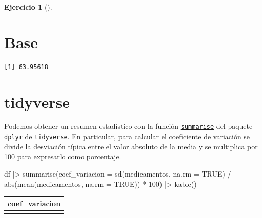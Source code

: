 \documentclass[
  spanish,
  a4paper,
]{scrreport}
\newenvironment{Shaded}{\begin{snugshade}}{\end{snugshade}}
\newcommand{\AttributeTok}[1]{\textcolor[rgb]{0.40,0.45,0.13}{#1}}
\newcommand{\ConstantTok}[1]{\textcolor[rgb]{0.56,0.35,0.01}{#1}}
\newcommand{\DecValTok}[1]{\textcolor[rgb]{0.68,0.00,0.00}{#1}}
\newcommand{\FunctionTok}[1]{\textcolor[rgb]{0.28,0.35,0.67}{#1}}
\newcommand{\NormalTok}[1]{\textcolor[rgb]{0.00,0.23,0.31}{#1}}
\newcommand{\SpecialCharTok}[1]{\textcolor[rgb]{0.37,0.37,0.37}{#1}}
\theoremstyle{definition}
\newtheorem{exercise}{Ejercicio}[chapter]
\theoremstyle{remark}
\begin{document}
\begin{exercise}[]
\begin{enumerate}
\begin{tcolorbox}
  \section{Base}

\begin{Shaded}
\end{Shaded}

\begin{verbatim}
[1] 63.95618
\end{verbatim}

  \section{tidyverse}

  Podemos obtener un resumen estadístico con la función
  \href{https://dplyr.tidyverse.org/reference/summarise.html}{\texttt{summarise}}
  del paquete \texttt{dplyr} de \texttt{tidyverse}. En particular, para
  calcular el coeficiente de variación se divide la desviación típica
  entre el valor absoluto de la media y se multiplica por 100 para
  expresarlo como porcentaje.

\begin{Shaded}
\begin{Highlighting}[]
\NormalTok{df }\SpecialCharTok{|\textgreater{}} \FunctionTok{summarise}\NormalTok{(}\AttributeTok{coef\_variacion =} \FunctionTok{sd}\NormalTok{(medicamentos, }\AttributeTok{na.rm =} \ConstantTok{TRUE}\NormalTok{) }\SpecialCharTok{/} \FunctionTok{abs}\NormalTok{(}\FunctionTok{mean}\NormalTok{(medicamentos, }\AttributeTok{na.rm =} \ConstantTok{TRUE}\NormalTok{)) }\SpecialCharTok{*} \DecValTok{100}\NormalTok{) }\SpecialCharTok{|\textgreater{}} 
    \FunctionTok{kable}\NormalTok{()}
\end{Highlighting}
\end{Shaded}

  \begin{longtable}[]{@{}r@{}}
  \toprule\noalign{}
  coef\_variacion \\
  \midrule\noalign{}
  \endhead
  \bottomrule\noalign{}
  \endlastfoot
  63.95618 \\
  \end{longtable}


\end{tcolorbox}
\end{enumerate}
\end{exercise}
\end{document}
